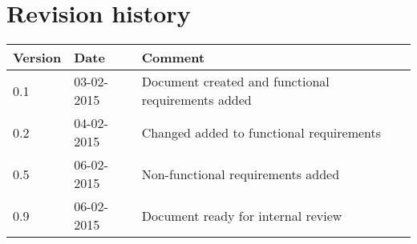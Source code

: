 \label{chp_revisionHistory}
\chapter{Revision history}

\begin{longtable}{| p{1.5cm}  | p{3cm} |  p{8cm} | }
	\hline
	\textbf{Version} & \textbf{Date} & \textbf{Comment} \\
	\hline
	0.1 & 03-02-2015 & Document created and functional requirements added  \\
	\hline
	0.2 & 04-02-2015 & Changed added to functional requirements \\
	\hline
	0.5 & 06-02-2015 & Non-functional requirements added \\
	\hline
	0.9 & 06-02-2015 & Document ready for internal review \\
	\hline
\end{longtable}


